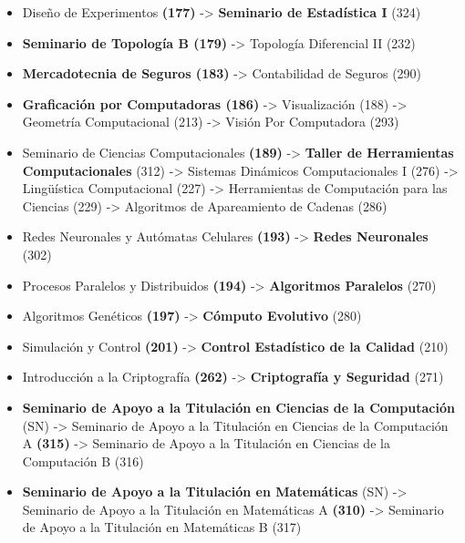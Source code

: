 \begin{appendices}
\begin{itemize}
  \item Diseño de Experimentos \textbf{(177)} -> \textbf{Seminario de Estadística I} (324)

  \item \textbf{Seminario de Topología B (179)} -> Topología Diferencial II (232)

  \item \textbf{Mercadotecnia de Seguros (183)} -> Contabilidad de Seguros (290)
  
  \item \textbf{Graficación por Computadoras (186)} -> Visualización (188) -> Geometría Computacional (213) -> Visión Por Computadora (293)
  
  \item Seminario de Ciencias Computacionales \textbf{(189)} -> \textbf{Taller de Herramientas Computacionales} (312) -> Sistemas Dinámicos Computacionales I (276) -> Lingüística Computacional (227) -> Herramientas de Computación para las Ciencias (229) -> Algoritmos de Apareamiento de Cadenas (286)
  
  \item Redes Neuronales y Autómatas Celulares \textbf{(193)} -> \textbf{Redes Neuronales} (302)
  
  \item Procesos Paralelos y Distribuidos \textbf{(194)} -> \textbf{Algoritmos Paralelos} (270)
  
  \item Algoritmos Genéticos \textbf{(197)} -> \textbf{Cómputo Evolutivo} (280)
  
  \item Simulación y Control \textbf{(201)} -> \textbf{Control Estadístico de la Calidad} (210)
  
  \item Introducción a la Criptografía \textbf{(262)} -> \textbf{Criptografía y Seguridad} (271)
  
  \item \textbf{Seminario de Apoyo a la Titulación en Ciencias de la Computación} (SN) -> Seminario de Apoyo a la Titulación en Ciencias de la Computación A \textbf{(315)} -> Seminario de Apoyo a la Titulación en Ciencias de la Computación B (316)
  
  \item \textbf{Seminario de Apoyo a la Titulación en Matemáticas} (SN) -> Seminario de Apoyo a la Titulación en Matemáticas A \textbf{(310)} -> Seminario de Apoyo a la Titulación en Matemáticas B (317)
  \end{itemize}%




\end{appendices}
